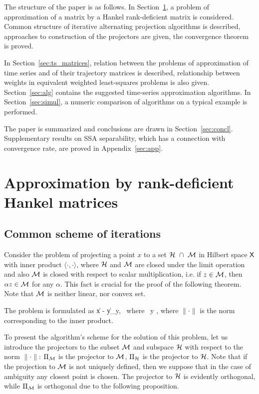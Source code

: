 \documentclass[sii]{ipart}
\begin{document}
The structure of the paper is as follows.  In Section~\ref{sec:lowrank_appr}, a problem of approximation of a matrix by a Hankel rank-deficient matrix is considered. Common structure of iterative alternating projection algorithms is described, approaches to construction of the projectors are given, the convergence theorem is proved.

In Section~\ref{sec:ts_matrices}, relation between the problems of approximation of time series and of their trajectory matrices is described, relationship between weights in equivalent weighted least-squares problems is also given. Section~\ref{sec:alg} contains the suggested time-series approximation algorithms. In Section~\ref{sec:simul}, a numeric comparison of algorithms on a typical example is performed.

The paper is summarized and conclusions are drawn in Section~\ref{sec:concl}. Supplementary results on SSA separability, which has a connection with convergence rate, are proved in Appendix~\ref{sec:app}.

\section{Approximation by rank-deficient Hankel matrices}
\label{sec:lowrank_appr}
\subsection{Common scheme of iterations}
Consider the problem of projecting a point $x$ to a set $\mathcal{H}~ \cap~\mathcal{M}$ in Hilbert space $\mathsf{X}$ with inner product $\langle \cdot, \cdot \rangle$, where $\mathcal{H}$ and $\mathcal{M}$ are closed under the limit operation and also $\mathcal{M}$ is closed with respect to scalar multiplication, i.e.
if $z \in \mathcal{M}$, then $\alpha z\in \mathcal{M}$ for any $\alpha$. This fact is crucial for the proof of the following theorem. Note that  $\mathcal{M}$ is neither  linear, nor convex set.

The problem is formulated as
\be
\label{eq:gen_task}
\|x - y\| \to \min_y, \mbox{\ where\ } y \in \calH \cap \calM,
\ee
where $\|\cdot\|$ is the norm corresponding to the inner product.

To present the algorithm's scheme for the solution of this problem, let us introduce the projectors to the subset $\mathcal{M}$ and subspace $\mathcal{H}$ with respect to the norm $\|\cdot\|$: $\Pi_{\mathcal{M}}$ is the projector to $\mathcal{M}$,
$\Pi_{\mathcal{H}}$ is the projector to $\mathcal{H}$.
Note that if the projection to $\mathcal{M}$ is not uniquely defined, then we suppose that in the case of ambiguity any closest point is chosen.
The projector to $\mathcal{H}$ is evidently orthogonal, while $\Pi_{\mathcal{M}}$ is orthogonal due to the following proposition.
\end{document}
